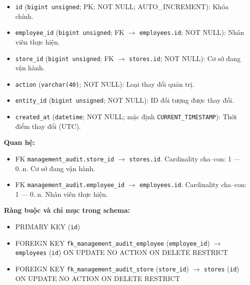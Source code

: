 \begin{itemize}

\item \texttt{id} (\texttt{bigint unsigned}; PK; NOT NULL; AUTO_INCREMENT): Khóa chính.

\item \texttt{employee\_id} (\texttt{bigint unsigned}; FK $\rightarrow$ \texttt{employees.id}; NOT NULL): Nhân viên thực hiện.

\item \texttt{store\_id} (\texttt{bigint unsigned}; FK $\rightarrow$ \texttt{stores.id}; NOT NULL): Cơ sở đang vận hành.

\item \texttt{action} (\texttt{varchar(40)}; NOT NULL): Loại thay đổi quản trị.

\item \texttt{entity\_id} (\texttt{bigint unsigned}; NOT NULL): ID đối tượng được thay đổi.

\item \texttt{created\_at} (\texttt{datetime}; NOT NULL; mặc định \texttt{CURRENT\_TIMESTAMP}): Thời điểm thay đổi (UTC).

\end{itemize}

\textbf{Quan hệ:}

\begin{itemize}

\item FK \texttt{management\_audit.store\_id} $\rightarrow$ \texttt{stores.id}. Cardinality cha--con: 1 — 0..n. Cơ sở đang vận hành.

\item FK \texttt{management\_audit.employee\_id} $\rightarrow$ \texttt{employees.id}. Cardinality cha--con: 1 — 0..n. Nhân viên thực hiện.

\end{itemize}

\textbf{Ràng buộc và chỉ mục trong schema:}

\begin{itemize}

\item PRIMARY KEY (\texttt{id})

\item FOREIGN KEY \texttt{fk\_management\_audit\_employee} (\texttt{employee\_id}) $\rightarrow$ \texttt{employees} (\texttt{id}) ON UPDATE NO ACTION ON DELETE RESTRICT

\item FOREIGN KEY \texttt{fk\_management\_audit\_store} (\texttt{store\_id}) $\rightarrow$ \texttt{stores} (\texttt{id}) ON UPDATE NO ACTION ON DELETE RESTRICT

\end{itemize}

